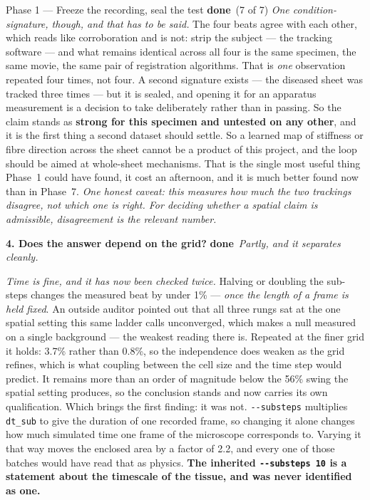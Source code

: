 \documentclass[11pt,a4paper]{article}
\newcommand{\code}[1]{\texttt{#1}}
\newcommand{\dn}{\textcolor{good}{\textbf{done}}}
\begin{document}
\begin{phasebox}{Phase 1 --- Freeze the recording, seal the test \hfill \dn\ (7 of 7)}
\emph{One condition-signature, though, and that has to be said.} The four beats agree with each
other, which reads like corroboration and is not: strip the subject --- the tracking software ---
and what remains identical across all four is the same specimen, the same movie, the same pair of
registration algorithms. That is \emph{one} observation repeated four times, not four. A second
signature exists --- the diseased sheet was tracked three times --- but it is sealed, and opening it
for an apparatus measurement is a decision to take deliberately rather than in passing. So the claim
stands as \textbf{strong for this specimen and untested on any other}, and it is the first thing a
second dataset should settle.
So a learned map of stiffness or fibre direction across the sheet cannot be a product of this
project, and the loop should be aimed at whole-sheet mechanisms. That is the single most useful
thing Phase~1 could have found, it cost an afternoon, and it is much better found now than in
Phase~7. \emph{One honest caveat: this measures how much the two trackings disagree, not which one
is right. For deciding whether a spatial claim is admissible, disagreement is the relevant number.}

\textbf{4. Does the answer depend on the grid?} \dn\ \emph{Partly, and it separates cleanly.}

\emph{Time is fine, and it has now been checked twice.} Halving or doubling the sub-steps changes
the measured beat by under 1\% --- \emph{once the length of a frame is held fixed}. An outside
auditor pointed out that all three rungs sat at the one spatial setting this same ladder calls
unconverged, which makes a null measured on a single background --- the weakest reading there is.
Repeated at the finer grid it holds: 3.7\% rather than 0.8\%, so the independence does weaken as
the grid refines, which is what coupling between the cell size and the time step would predict. It
remains more than an order of magnitude below the 56\% swing the spatial setting produces, so the
conclusion stands and now carries its own qualification. Which brings the first finding: it was not.
\code{-{}-substeps} multiplies \code{dt\_sub} to give the duration of one recorded frame, so
changing it alone changes how much simulated time one frame of the microscope corresponds to.
Varying it that way moves the enclosed area by a factor of 2.2, and every one of those batches
would have read that as physics. \textbf{The inherited \code{-{}-substeps 10} is a statement about
the timescale of the tissue, and was never identified as one.}


\end{phasebox}
\end{document}
